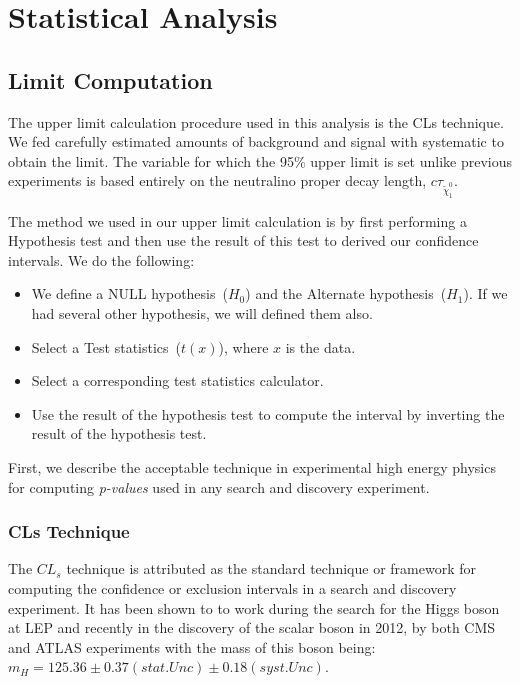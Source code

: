 \chapter{Statistical Analysis}
\label{Limit_Setting}


\section{Limit Computation}
The upper limit calculation procedure used in this analysis is the CLs technique. We fed carefully estimated amounts 
of background and signal with systematic to obtain the limit.
The variable for which the 95\% upper limit is set unlike previous experiments is based entirely on the neutralino proper decay length, $c\tau_{\tilde{\chi}^{0}_{1}}$. 

The method we used in our upper limit calculation is by first performing a Hypothesis test and then use the result of this test to derived our confidence intervals. We do the following:
\begin{itemize}
\item We define a NULL hypothesis~($H_{0}$) and the Alternate hypothesis~($H_{1}$). If we had several other hypothesis, we will defined them also.
\item Select a Test statistics~($t(x)$), where $x$ is the data.
\item Select a corresponding test statistics calculator.
\item Use the result of the hypothesis test to compute the interval by inverting the result of the hypothesis test.
\end{itemize}
First, we describe the acceptable technique in experimental high energy physics for computing \textit{p-values} used in any search and discovery experiment.
\subsection{CLs Technique}
The $CL_{s}$ technique \cite{CLS} is attributed as the standard technique or framework for computing the confidence or exclusion intervals in a search and discovery experiment. It has been shown to to work during the search for the Higgs boson at LEP and recently in the discovery of the scalar boson in 2012, by both CMS and ATLAS experiments with the mass of this boson being: $m_{H} = 125.36\pm 0.37(stat.Unc)\pm0.18(syst.Unc)$.

